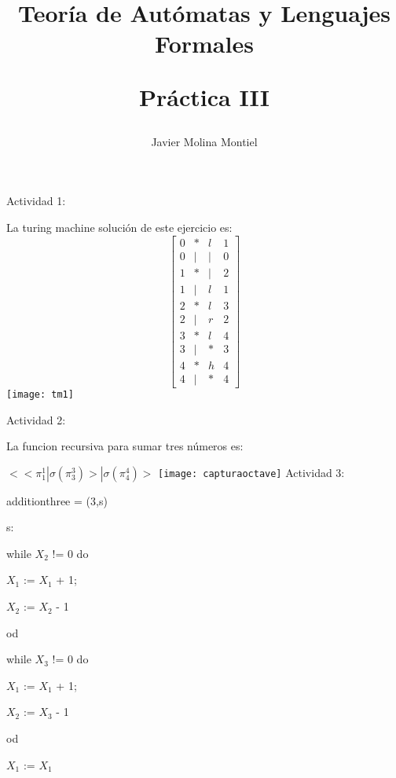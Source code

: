 \documentclass{article}
\title{\Large \bf Teoría de Autómatas y Lenguajes Formales

\LARGE \rm Práctica III}
\author{Javier Molina Montiel}
\begin{document}
\maketitle
\justify\normalsize
Actividad 1:

La turing machine solución de este ejercicio es:
\[
\begin{bmatrix}
0 & * & l & 1\\
0 & | & | & 0\\
1 & * & | & 2\\
1 & | & l & 1\\
2 & * & l & 3\\
2 & | & r & 2\\
3 & * & l & 4\\
3 & | & * & 3\\
4 & * & h & 4\\
4 & | & * & 4
\end{bmatrix}
\]
\texttt{[image: tm1]}

\justify\normalsize
Actividad 2:

La funcion recursiva para sumar tres números es:

$<<\pi_1^1 | \sigma (\pi_3^3) > | \sigma (\pi_4^4) >$
\justify\normalsize
\texttt{[image: capturaoctave]}
\justify\normalsize
Actividad 3:

additionthree = (3,s)

s:

\quad while $X_2$ != 0 do 

\quad\quad $X_1$ := $X_1$  + 1;

\quad\quad $X_2$ := $X_2$  - 1

\quad od

\quad \quad while $X_3$ != 0 do 

\quad\quad\quad $X_1$ := $X_1$  + 1;

\quad\quad\quad $X_2$ := $X_3$  - 1

\quad\quad od

\quad\quad\quad $X_1$ := $X_1$
\end{document}
